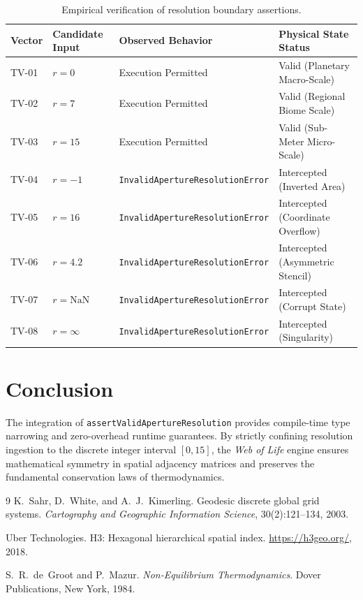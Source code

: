 \documentclass[11pt,a4paper]{article}
\begin{document}
\begin{table}[h!]
\centering
\small
\begin{tabular}{@{}llll@{}}
\toprule
\textbf{Vector} & \textbf{Candidate Input} & \textbf{Observed Behavior} & \textbf{Physical State Status} \\ \midrule
TV-01 & $r = 0$ & Execution Permitted & Valid (Planetary Macro-Scale) \\
TV-02 & $r = 7$ & Execution Permitted & Valid (Regional Biome Scale) \\
TV-03 & $r = 15$ & Execution Permitted & Valid (Sub-Meter Micro-Scale) \\
TV-04 & $r = -1$ & \texttt{InvalidApertureResolutionError} & Intercepted (Inverted Area) \\
TV-05 & $r = 16$ & \texttt{InvalidApertureResolutionError} & Intercepted (Coordinate Overflow) \\
TV-06 & $r = 4.2$ & \texttt{InvalidApertureResolutionError} & Intercepted (Asymmetric Stencil) \\
TV-07 & $r = \text{NaN}$ & \texttt{InvalidApertureResolutionError} & Intercepted (Corrupt State) \\
TV-08 & $r = \infty$ & \texttt{InvalidApertureResolutionError} & Intercepted (Singularity) \\ \bottomrule
\end{tabular}
\caption{Empirical verification of resolution boundary assertions.}
\end{table}

\section{Conclusion}
The integration of \texttt{assertValidApertureResolution} provides compile-time type narrowing and zero-overhead runtime guarantees. By strictly confining resolution ingestion to the discrete integer interval $[0, 15]$, the \emph{Web of Life} engine ensures mathematical symmetry in spatial adjacency matrices and preserves the fundamental conservation laws of thermodynamics.


\begin{thebibliography}{9}
K.~Sahr, D.~White, and A.~J.~Kimerling.
\newblock Geodesic discrete global grid systems.
\newblock \emph{Cartography and Geographic Information Science}, 30(2):121--134, 2003.

Uber Technologies.
\newblock H3: Hexagonal hierarchical spatial index.
\newblock \url{https://h3geo.org/}, 2018.

S.~R.~de~Groot and P.~Mazur.
\newblock \emph{Non-Equilibrium Thermodynamics}.
\newblock Dover Publications, New York, 1984.
\end{thebibliography}
\end{document}
